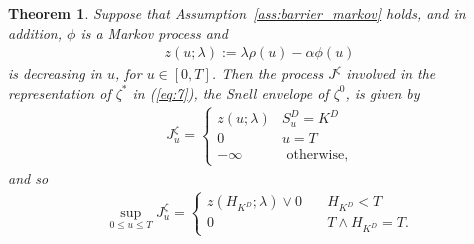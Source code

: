 \documentclass[a4paper]{amsart}
\newtheorem{theorem}{Theorem}[section]
\theoremstyle{definition}
\theoremstyle{remark}
\numberwithin{equation}{section}
\newcommand{\E}{\mathbb{E}}
\renewcommand{\P}{\mathbb{P}}
\newcommand{\Ebq}[1]{\E^{\bQ}\left[#1\right]}
\renewcommand{\Pr}{\P}
\newcommand{\ol}{\overline}
\newcommand{\cblue}{\color{blue}}
\newcommand{\bQ}{\ol{\mathbb{Q}}}
\begin{document}
 


\begin{theorem} \label{thm:long-position-call}
  Suppose that Assumption~\ref{ass:barrier_markov} holds, and in addition, $\phi$ is a Markov process and
  \begin{align}\label{def:z}
    z(u; \lambda) := \lambda \rho(u) - \alpha \phi(u)
  \end{align}
  is decreasing in $u$, for $u \in [0,T]$. Then the process  $J^\zeta$ involved in the representation of $\zeta^*$ in (\ref{eq:7}),  the Snell envelope of $\zeta^0$,
  is given by 
   \begin{align*}
    J_u^\zeta =
    \begin{cases}
      z(u; \lambda) & S_u^D = K^D\\
      0 & u = T\\
      - \infty & \text{ otherwise},
    \end{cases}
  \end{align*}
  and so
  \begin{align*}
    \sup_{0 \le u \le T} J_u^\zeta =
    \begin{cases}
      z(H_{K^D}; \lambda) \vee 0 & \quad H_{K^D} < T\\
      0 & \quad T \wedge H_{K^D} = T.
    \end{cases}
  \end{align*}
\end{theorem}
\end{document}
